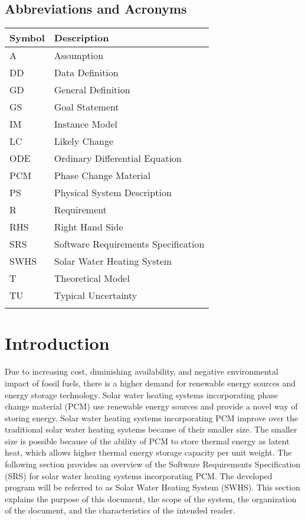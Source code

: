 \documentclass[12pt]{article}
\begin{document}
\subsection{Abbreviations and Acronyms}
\label{Sec:TAbbAcc}
\begin{longtable*}{l l}
\toprule
Symbol & Description
\\
\midrule
A & Assumption
\\
DD & Data Definition
\\
GD & General Definition
\\
GS & Goal Statement
\\
IM & Instance Model
\\
LC & Likely Change
\\
ODE & Ordinary Differential Equation
\\
PCM & Phase Change Material
\\
PS & Physical System Description
\\
R & Requirement
\\
RHS & Right Hand Side
\\
SRS & Software Requirements Specification
\\
SWHS & Solar Water Heating System
\\
T & Theoretical Model
\\
TU & Typical Uncertainty
\\
\bottomrule
\label{Table:TAbbAcc}
\end{longtable*}
\section{Introduction}
\label{Sec:Intro}
Due to increasing cost, diminishing availability, and negative environmental impact of fossil fuels, there is a higher demand for renewable energy sources and energy storage technology. Solar water heating systems incorporating phase change material (PCM) use renewable energy sources and provide a novel way of storing energy. Solar water heating systems incorporating PCM improve over the traditional solar water heating systems because of their smaller size. The smaller size is possible because of the ability of PCM to store thermal energy as latent heat, which allows higher thermal energy storage capacity per unit weight.
The following section provides an overview of the Software Requirements Specification (SRS) for solar water heating systems incorporating PCM. The developed program will be referred to as Solar Water Heating System (SWHS). This section explains the purpose of this document, the scope of the system, the organization of the document, and the characteristics of the intended reader.
\end{document}
